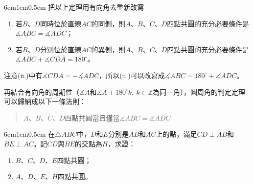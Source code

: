 \documentclass[12pt]{article}
\begin{document}
\begin{mybox}[定理簡化]{6em}{1em}{0.5em}
    把以上定理用有向角去重新改寫
    \begin{enumerate}[label= (\roman*.), itemsep=0.3em]
        \item 若$B$、$D$同時位於直線$AC$的同側，則$A$、$B$、$C$、$D$四點共圓的充分必要條件是$\measuredangle{ABC}=\measuredangle{ADC}$；
        \item 若$B$、$D$分別位於直線$AC$的異側，則$A$、$B$、$C$、$D$四點共圓的充分必要條件是$\measuredangle{ABC}+\measuredangle{CDA}=180^{\circ}$。
    \end{enumerate}
    注意(ii.)中有$\measuredangle{CDA}=-\measuredangle{ADC}$，所以(ii.)可以改寫成$\measuredangle{ABC}=180^{\circ}+\measuredangle{ADC}$。

    再結合有向角的周期性（$\measuredangle{A}$和$\measuredangle{A}+180^{\circ}k,\ k\in\mathbb{Z}$為同一角），圓周角的判定定理可以歸納成以下一條法則：
    \begin{quotation}
        $A$、$B$、$C$、$D$四點共圓當且僅當$\measuredangle{ABC}=\measuredangle{ADC}$
    \end{quotation}
\end{mybox}
\begin{mybox}[例題\thesubsection-1]{6em}{1em}{0.5em}
    在$\triangle{ABC}$中，$D$和$E$分別是$AB$和$AC$上的點，滿足$CD\perp AB$和$BE\perp AC$。記$CD$與$BE$的交點為$H$，求證：
    \begin{enumerate}[label = (\roman*.), itemsep=0.3em]
        \item $B$、$C$、$D$、$E$四點共圓；
        \item $A$、$D$、$E$、$H$四點共圓。
    \end{enumerate}
\end{mybox}
\end{document}

